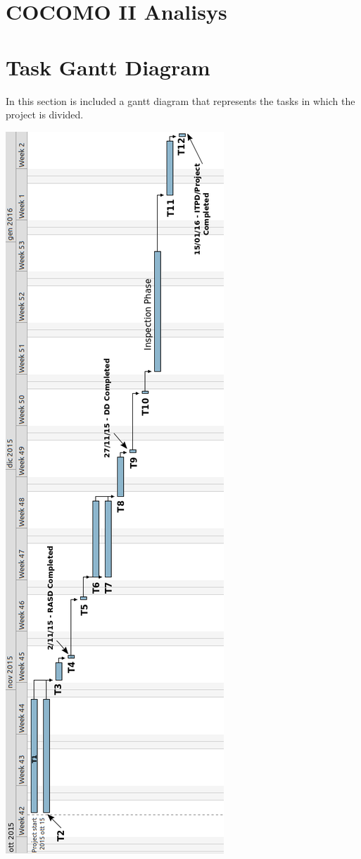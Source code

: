 \documentclass[11pt,titlepage]{article} %
\begin{document}
\newpage
\section{COCOMO II Analisys}

\newpage

\section{Task Gantt Diagram}
 In this section is included a gantt diagram that represents the tasks in which the project is divided.\newline
 \begin{center}
  \includegraphics[scale=0.4]{gantt.png}
 \end{center}
\newpage
\end{document}
